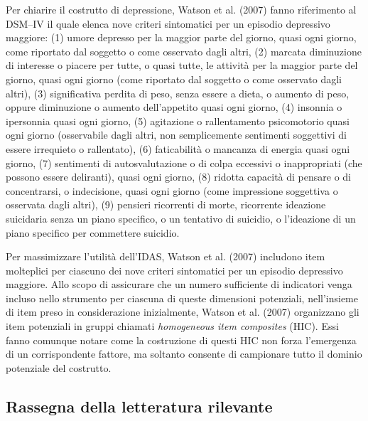 \begin{exmp}
Per chiarire il costrutto di depressione, Watson et al. (2007) fanno riferimento al DSM–IV il quale elenca nove criteri sintomatici per un episodio depressivo maggiore: (1) umore depresso per la maggior parte del giorno, quasi ogni giorno, come riportato dal soggetto o come osservato dagli altri, (2) marcata diminuzione di interesse o piacere per tutte, o quasi tutte, le attività per la maggior parte del giorno, quasi ogni giorno (come riportato dal soggetto o come osservato dagli altri), (3) significativa perdita di peso, senza essere a dieta, o aumento di peso, oppure diminuzione o aumento dell'appetito quasi ogni giorno, (4) insonnia o ipersonnia quasi ogni giorno, (5) agitazione o rallentamento psicomotorio quasi ogni giorno (osservabile dagli altri, non semplicemente sentimenti soggettivi di essere irrequieto o rallentato), (6) faticabilità o mancanza di energia quasi ogni giorno, (7) sentimenti di autosvalutazione o di colpa eccessivi o inappropriati (che possono essere deliranti), quasi ogni giorno, (8) ridotta capacità di pensare o di concentrarsi, o indecisione, quasi ogni giorno (come impressione soggettiva o osservata dagli altri), (9) pensieri ricorrenti di morte, ricorrente ideazione suicidaria senza un piano specifico, o un tentativo di suicidio, o l'ideazione di un piano specifico per commettere suicidio.

Per massimizzare l'utilità dell'IDAS, Watson et al. (2007) includono item molteplici per ciascuno dei nove criteri sintomatici per un episodio depressivo maggiore. Allo scopo di assicurare che un numero sufficiente di indicatori venga incluso nello strumento per ciascuna di queste dimensioni potenziali, nell'insieme di item preso in considerazione inizialmente, Watson et al. (2007) organizzano gli item potenziali in gruppi chiamati \emph{homogeneous item composites} (HIC). Essi fanno comunque notare come la costruzione di questi HIC non forza l'emergenza di un corrispondente fattore, ma soltanto consente di campionare tutto il dominio potenziale del costrutto.

\end{exmp}


\subsection{Rassegna della letteratura rilevante}

